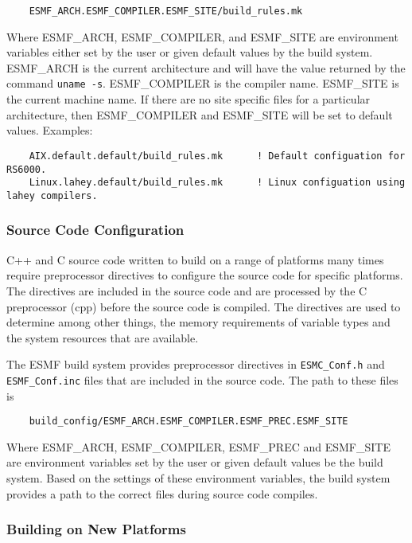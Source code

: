 \begin{verbatim}
    ESMF_ARCH.ESMF_COMPILER.ESMF_SITE/build_rules.mk
\end{verbatim}

Where ESMF\_ARCH, ESMF\_COMPILER, and ESMF\_SITE are environment
variables either set by the user or given default values by the build
system. ESMF\_ARCH is the current architecture and will have the value
returned by the command {\tt uname -s}.  ESMF\_COMPILER is the compiler
name.  ESMF\_SITE is the current machine name. If there are no site
specific files for a particular architecture, then ESMF\_COMPILER and
ESMF\_SITE will be set to default values.  Examples:

\begin{verbatim}
    AIX.default.default/build_rules.mk      ! Default configuation for RS6000.
    Linux.lahey.default/build_rules.mk      ! Linux configuation using lahey compilers.
\end{verbatim}

\subsubsection{Source Code Configuration}

C++ and C source code written to build on a range of platforms many
times require preprocessor directives to configure the source code for
specific platforms.  The directives are included in the source code
and are processed by the C preprocessor (cpp) before the source code
is compiled.  The directives are used to determine among other things,
the memory requirements of variable types and the system resources
that are available.

The ESMF build system provides preprocessor directives in 
{\tt ESMC\_Conf.h} and {\tt ESMF\_Conf.inc} files
that are included in the source code.  The path to these files is

\begin{verbatim}
    build_config/ESMF_ARCH.ESMF_COMPILER.ESMF_PREC.ESMF_SITE
\end{verbatim}

Where ESMF\_ARCH, ESMF\_COMPILER, ESMF\_PREC and ESMF\_SITE are
environment variables set by the user or given default values be the
build system.  Based on the settings of these environment variables,
the build system provides a path to the correct files during
source code compiles.

\subsubsection{Building on New Platforms}

